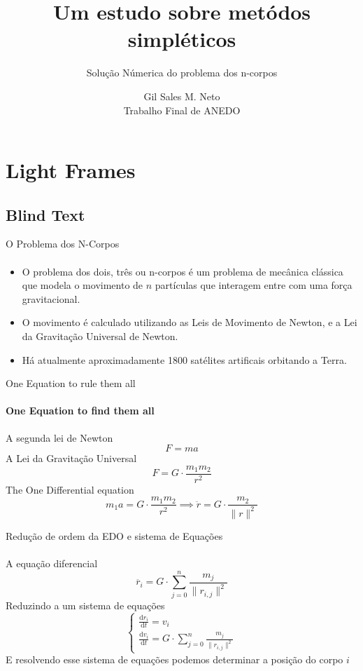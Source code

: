 \documentclass{beamer}
\title{Um estudo sobre metódos simpléticos} %
\subtitle{Solução Númerica do problema dos n-corpos} %
\author{Gil Sales M. Neto \\ {\tiny Trabalho Final de ANEDO}}
\begin{document}
  \frame{\maketitle}


    \section{Light Frames}
    \subsection{Blind Text}
    \begin{frame}{O Problema dos N-Corpos}
      \framesubtitle{}%
      \begin{itemize}
      \item O problema dos dois, três ou n-corpos é um problema de mecânica clássica que modela o movimento de \(n\) partículas que interagem entre com uma força gravitacional.
      \item O movimento é calculado utilizando as Leis de Movimento de Newton, e a Lei da Gravitação Universal de Newton.
      \item Há atualmente aproximadamente 1800 satélites artificais orbitando a Terra.
    \end{itemize}
    \end{frame}

    \begin{frame}{One Equation to rule them all}
      \framesubtitle{One Equation to \alert{find} them all}%
      A segunda lei de Newton
      \[F = ma\]
      A Lei da Gravitação Universal
      \[F = G \cdot \frac{m_1 m_2}{r ^2}\]
      The One Differential equation
      \[
        m_1a = G \cdot \frac{m_1 m_2}{r ^2} \implies \ddot{r} = G \cdot \frac{m_2}{\lVert r \rVert ^2}
      \]
    \end{frame}

    \begin{frame}{Redução de ordem da EDO e sistema de Equações}
      \framesubtitle{}%
      A equação diferencial
      \[
        \ddot{r_i} = G \cdot \sum_{j = 0}^{n}\frac{m_j}{\lVert r_{i,j} \rVert ^2}
      \]
      Reduzindo a um sistema de equações
      \[
      \begin{cases}
        \frac{\mathrm{d}r_i}{\mathrm{d}t} = v_i \\
        \frac{\mathrm{d}v_i}{\mathrm{d}t} = G \cdot \displaystyle \sum_{j = 0}^{n}\frac{m_j}{\lVert r_{i,j} \rVert ^2}
      \end{cases}
      \]
      E resolvendo esse sistema de equações podemos determinar a posição do corpo \(i\)
    \end{frame}
\end{document}
